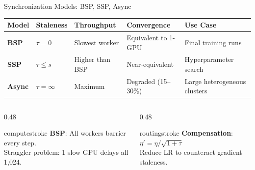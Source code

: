\documentclass[aspectratio=169, 12pt]{beamer}
\begin{document}
\begin{frame}{Synchronization Models: BSP, SSP, Async}

\footnotesize
\renewcommand{\arraystretch}{1.15}
\begin{tabular}{@{}lp{1.8cm}p{2cm}p{2.5cm}p{3cm}@{}}
  \toprule
  \textbf{Model} & \textbf{Staleness} & \textbf{Throughput} & \textbf{Convergence} & \textbf{Use Case} \\
  \midrule
  \textbf{BSP}   & $\tau = 0$       & Slowest worker & Equivalent to 1-GPU & Final training runs \\
  \textbf{SSP}   & $\tau \leq s$    & Higher than BSP & Near-equivalent      & Hyperparameter search \\
  \textbf{Async}  & $\tau = \infty$  & Maximum         & Degraded (15--30\%)  & Large heterogeneous clusters \\
  \bottomrule
\end{tabular}

\vspace{0.15cm}
\begin{columns}[T]
  \begin{column}{0.48\textwidth}
    \begin{mlsyscard}{computestroke}
    \textbf{BSP}: All workers barrier every step.\\
    {\scriptsize Straggler problem: 1 slow GPU delays all 1,024.}
    \end{mlsyscard}
  \end{column}
  \begin{column}{0.48\textwidth}
    \begin{mlsyscard}{routingstroke}
    \textbf{Compensation}: $\eta' = \eta / \sqrt{1 + \tau}$\\
    {\scriptsize Reduce LR to counteract gradient staleness.}
    \end{mlsyscard}
  \end{column}
\end{columns}

\end{frame}
\end{document}
